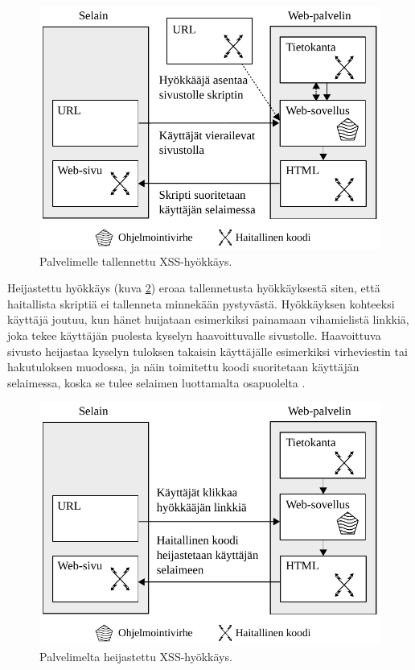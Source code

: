 \begin{figure}[htp]
\centering
\includegraphics[width=12cm]{pics/tallennettu.pdf}
\caption{Palvelimelle tallennettu XSS-hyökkäys.}
\label{tallennettu}
\end{figure}

\newpage
Heijastettu hyökkäys (kuva \ref{heijastettu}) eroaa tallennetusta hyökkäyksestä siten, että haitallista skriptiä ei tallenneta minnekään pystyvästä. Hyökkäyksen kohteeksi käyttäjä joutuu, kun 
hänet huijataan esimerkiksi painamaan vihamielistä linkkiä, joka tekee käyttäjän puolesta kyselyn haavoittuvalle sivustolle. Haavoittuva sivusto heijastaa kyselyn tuloksen 
takaisin käyttäjälle esimerkiksi virheviestin tai hakutuloksen muodossa, ja näin toimitettu koodi suoritetaan käyttäjän selaimessa, koska se tulee selaimen luottamalta
osapuolelta  \cite{WEB2}.

\begin{figure}[htp]
\centering
\includegraphics[width=12cm]{pics/heijastettu.pdf}
\caption{Palvelimelta heijastettu XSS-hyökkäys.}
\label{heijastettu}
\end{figure}

